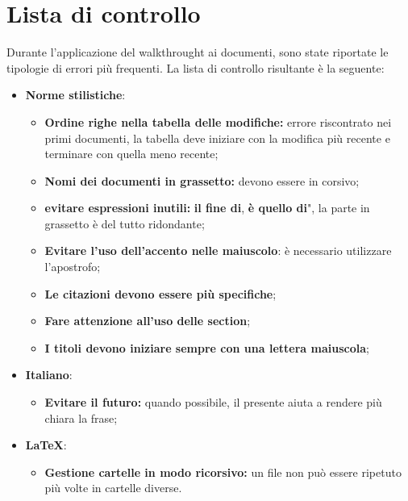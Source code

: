 \chapter{Lista di controllo}
\label{ListaControllo}
Durante l'applicazione del walkthrought ai documenti, sono state riportate le tipologie di errori più frequenti. La lista di controllo risultante è la seguente:
\begin{itemize}
	\item \textbf{Norme stilistiche}:
	\begin{itemize}
		\item \textbf{Ordine righe nella tabella delle modifiche:} errore riscontrato nei primi documenti, la tabella deve iniziare con la modifica più recente e terminare con quella meno recente;
		\item \textbf{Nomi dei documenti in grassetto:} devono essere in corsivo;
		\item \textbf{evitare espressioni inutili:} \textbf{il fine di}, \textbf{è quello di}", la parte in grassetto è del tutto ridondante;
		\item \textbf{Evitare l'uso dell'accento nelle maiuscolo}: è necessario utilizzare l'apostrofo;
		\item \textbf{Le citazioni devono essere più specifiche};
		\item \textbf{Fare attenzione all'uso delle section};
		\item \textbf{I titoli devono iniziare sempre con una lettera maiuscola};
	\end{itemize}
	\item \textbf{Italiano}:
	\begin{itemize}
		\item \textbf{Evitare il futuro:} quando possibile, il presente aiuta a rendere più chiara la frase;
	\end{itemize}
	\item \textbf{\LaTeX}:
	\begin{itemize}
		\item \textbf{Gestione cartelle in modo ricorsivo:} un file non può essere ripetuto più volte in cartelle diverse.
	\end{itemize}
\end{itemize}